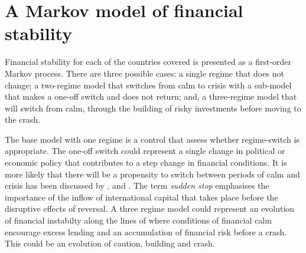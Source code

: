 \documentclass[12pt, a4paper, oneside]{article} %
\begin{document}

\section{A Markov model of financial stability}
Financial stability for each of the countries covered is presented as a first-order Markov process.  There are three possible cases:  a single regime that does not change; a two-regime model that switches from calm to crisis with a sub-model that makes a one-off switch and does not return; and, a three-regime model that will switch from calm, through the building of risky investments before moving to the crash.  

The base model with one regime is a control that assess whether regime-switch is appropriate.  The one-off switch could represent a single change in political or economic policy that contributes to a step change in financial conditions.  It is more likely that there will be a propensity to switch between periods of calm and crisis has been discussed by \citet{DornbuschSS}, \citet{CalvoSS} and \citet{KrugmanSS}.  The term \emph{sudden stop} emphasises the importance of the inflow of international capital that takes place before the disruptive effects of reversal.  A three regime model could represent an evolution of financial instabilty along the lines of \citet{MinskyKeynes, MinskyFIH, MinskyLongerWaves} where conditions of financial calm encourage excess lending and an accumulation of financial risk before a crash.  This could be an evolution of caution, building and crash.  
\end{document}
